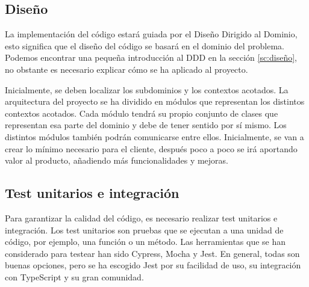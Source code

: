 \subsection{Diseño}
La implementación del código estará guiada por el Diseño Dirigido al Dominio, esto significa que el diseño del código se basará en el dominio del problema.
Podemos encontrar una pequeña introducción al DDD en la sección \ref{sc:diseño}, no obstante es necesario explicar cómo se ha aplicado al proyecto.

Inicialmente, se deben localizar los subdominios y los contextos acotados. La arquitectura del proyecto se ha dividido en módulos que representan los distintos contextos acotados.
Cada módulo tendrá su propio conjunto de clases que representan esa parte del dominio y debe de tener sentido por sí mismo. Los distintos módulos también podrán comunicarse entre ellos.
Inicialmente, se van a crear lo mínimo necesario para el cliente, después poco a poco se irá aportando valor al producto, añadiendo más funcionalidades y mejoras.

\subsection{Test unitarios e integración}
Para garantizar la calidad del código, es necesario realizar test unitarios e integración. Los test unitarios son pruebas que se ejecutan a una unidad de código, por ejemplo, una función o un método.
Las herramientas que se han considerado para testear han sido Cypress, Mocha y Jest.
En general, todas son buenas opciones, pero se ha escogido Jest por su facilidad de uso, su integración con TypeScript y su gran comunidad.
